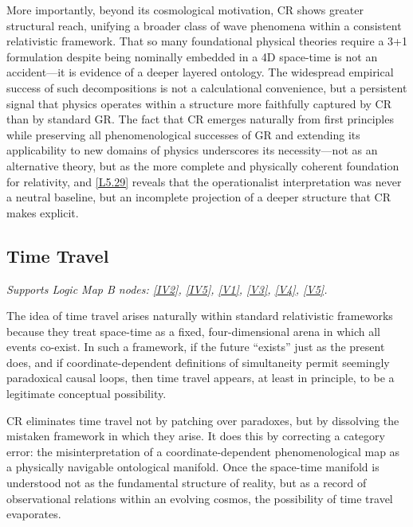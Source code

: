\documentclass[12pt]{book}
\newcounter{logicanchor}
\newenvironment{logicanchorenv}[1]{\refstepcounter{logicanchor}\label{#1}}{}
\newcommand{\logiclink}[2]{\begin{logicanchorenv}{logic:#1}\end{logicanchorenv}\hyperref[appendix:#1]{[#1]}\xspace}
\begin{document}
More importantly, beyond its cosmological motivation, CR shows greater structural reach, unifying a broader class of wave phenomena within a consistent relativistic framework. That so many foundational physical theories require a 3+1 formulation despite being nominally embedded in a 4D space-time is not an accident---it is evidence of a deeper layered ontology. The widespread empirical success of such decompositions is not a calculational convenience, but a persistent signal that physics operates within a structure more faithfully captured by CR than by standard GR. The fact that CR emerges naturally from first principles while preserving all phenomenological successes of GR and extending its applicability to new domains of physics underscores its necessity---not as an alternative theory, but as the more complete and physically coherent foundation for relativity, and \logiclink{L5.29}{} reveals that the operationalist interpretation was never a neutral baseline, but an incomplete projection of a deeper structure that CR makes explicit.

\subsection{Time Travel}\label{sec:5.4.2}
\noindent\textit{Supports Logic Map B nodes: \hyperref[appendix:IV2]{[IV2]}, \hyperref[appendix:IV5]{[IV5]}, \hyperref[appendix:V1]{[V1]}, \hyperref[appendix:V3]{[V3]}, \hyperref[appendix:V4]{[V4]}, \hyperref[appendix:V5]{[V5]}.}

\vspace{4pt}

The idea of time travel arises naturally within standard relativistic frameworks because they treat space-time as a fixed, four-dimensional arena in which all events co-exist. In such a framework, if the future ``exists'' just as the present does, and if coordinate-dependent definitions of simultaneity permit seemingly paradoxical causal loops, then time travel appears, at least in principle, to be a legitimate conceptual possibility.

CR eliminates time travel not by patching over paradoxes, but by dissolving the mistaken framework in which they arise. It does this by correcting a category error: the misinterpretation of a coordinate-dependent phenomenological map as a physically navigable ontological manifold. Once the space-time manifold is understood not as the fundamental structure of reality, but as a record of observational relations within an evolving cosmos, the possibility of time travel evaporates.
\end{document}
